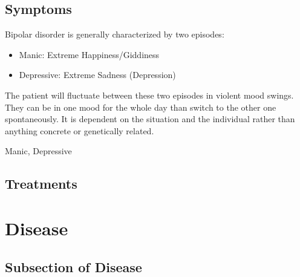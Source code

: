 \documentclass[journal]{IEEEtran}
\begin{document}
\subsection{Symptoms}
Bipolar disorder is generally characterized by two episodes:
\\
\begin{itemize}
\item Manic: Extreme Happiness/Giddiness
\item Depressive: Extreme Sadness (Depression)
\end{itemize}
\vspace{2 mm}
The patient will fluctuate between these two episodes in violent mood swings. They can be in one mood for the whole day than switch to the other one spontaneously. It is dependent on the situation and the individual rather than anything concrete or genetically related.
\begin{IEEEkeywords}
Manic, Depressive
\end{IEEEkeywords}
\subsection{Treatments}


\section{Disease}
\begin{abstract}
\blindtext[1]
\end{abstract}
\begin{IEEEkeywords}
\blindtext[1]
\end{IEEEkeywords}
\blindtext[1]
\subsection{Subsection of Disease}
\begin{abstract}
\blindtext[1]
\end{abstract}
\begin{IEEEkeywords}
\blindtext[1]
\end{IEEEkeywords}
\blindtext


\end{document}
